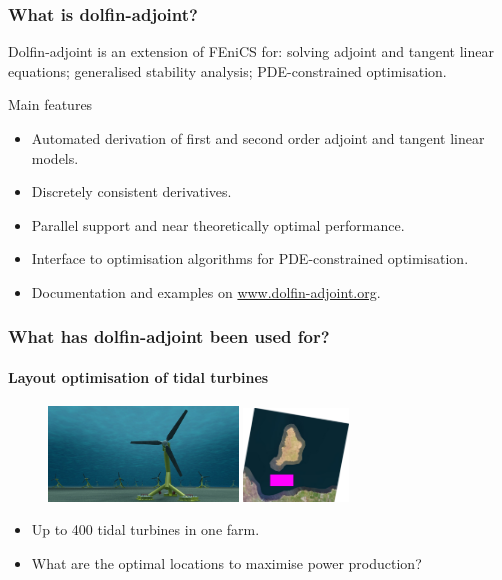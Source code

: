 \begin{frame}
    \frametitle{What is dolfin-adjoint?}

    Dolfin-adjoint is an extension of FEniCS for: solving adjoint and
    tangent linear equations; generalised stability analysis;
    PDE-constrained optimisation.

    \begin{block}{Main features}
        \begin{itemize}
            \item Automated derivation of first and second order adjoint and tangent linear models.
            \item Discretely consistent derivatives.
            \item Parallel support and near theoretically optimal performance.
            \item Interface to optimisation algorithms for PDE-constrained optimisation.
            \item Documentation and examples on \url{www.dolfin-adjoint.org}.
        \end{itemize}
    \end{block}

\end{frame}

\begin{frame}
    \frametitle{What has dolfin-adjoint been used for?}
    \framesubtitle{Layout optimisation of tidal turbines}
    \begin{figure}
    \begin{center}
        \includegraphics[width=0.45\textwidth]{jpg/tidal_farm}
        \hspace{1cm}
        \includegraphics[width=0.25\textwidth]{png/satellite}
    \end{center}
    \end{figure}
        \begin{itemize}
            \item Up to 400 tidal turbines in one farm.
            \item What are the optimal locations to maximise power production?
        \end{itemize}
\end{frame}

